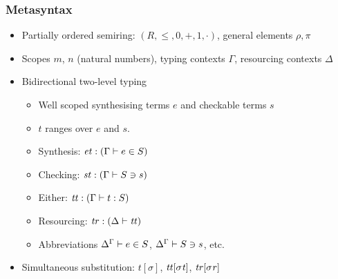 \documentclass{beamer}
\begin{document}
  \begin{frame}
    \frametitle{Metasyntax}
    \begin{itemize}
    \item Partially ordered semiring: $(R, \leq, 0, +, 1, \cdot)$, general elements $\rho, \pi$ \pause
    \item Scopes $m$, $n$ (natural numbers), typing contexts $\Gamma$,
      resourcing contexts $\Delta$ \pause
    \item Bidirectional two-level typing
      \begin{itemize}
      \item Well scoped synthesising terms $e$ and checkable terms $s$
      \item $t$ ranges over $e$ and $s$. \pause
      \item Synthesis: $\mathit{et} : (\Gamma \vdash e \in S)$ \pause
      \item Checking: $\mathit{st} : (\Gamma \vdash S \ni s)$ \pause
      \item Either: $\mathit{tt} : (\Gamma \vdash t : S)$ \pause
      \item Resourcing: $\mathit{tr} : (\Delta \vdash \mathit{tt})$ \pause
      \item Abbreviations ${\Delta}^{\Gamma} \vdash e \in S$,
        ${\Delta}^{\Gamma} \vdash S \ni s$, etc. \pause
      \end{itemize}
    \item Simultaneous substitution: $t[\sigma]$, $\mathit{tt}[\mathit{\sigma t}]$,
      $\mathit{tr}[\mathit{\sigma r}]$
    \end{itemize}
  \end{frame}
\end{document}
